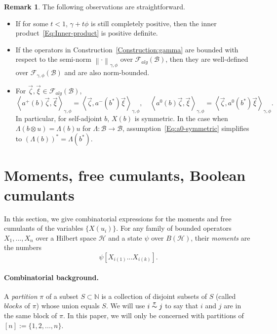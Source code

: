 \documentclass[12pt]{amsart}
\theoremstyle{definition}
\newtheorem{Remark}[Thm]{Remark}
\newcommand{\mc}[1]{\mathcal{#1}}
\newcommand{\ip}[2]{\left \langle{#1},{#2} \right \rangle}
\newcommand{\norm}[1]{\left \|{#1} \right \|}
\begin{document}
\begin{Remark}
The following observations are straightforward.
\begin{itemize}
\item
If for some $t < 1$, $\gamma + t \phi$ is still completely positive, then the inner product~\eqref{Eq:Inner-product} is positive definite.
\item
If the operators in Construction~\ref{Construction:gamma} are bounded with respect to the semi-norm $\norm{\cdot}_{\gamma, \phi}$ over $\mc{F}_{alg}(\mc{B})$, then they are well-defined over $\mc{F}_{\gamma, \phi}(\mc{B})$ and are also norm-bounded.
\item
For $\vec{\zeta}, \vec{\xi} \in \mc{F}_{alg}(\mc{B})$,
\[
\ip{a^+(b) \vec{\zeta}}{\vec{\xi}}_{\gamma, \phi} = \ip{\vec{\zeta}}{a^-(b^\ast) \vec{\xi}}_{\gamma, \phi}, \quad
\ip{a^0(b) \vec{\zeta}}{\vec{\xi}}_{\gamma, \phi} = \ip{\vec{\zeta}}{a^0(b^\ast) \vec{\xi}}_{\gamma, \phi}.
\]
In particular, for self-adjoint $b$, $X(b)$ is symmetric. In the case when $\Lambda(b \otimes u) = \Lambda(b) u$ for $\Lambda : \mc{B} \rightarrow \mc{B}$, assumption~\eqref{Eq:a0-symmetric} simplifies to $(\Lambda(b))^\ast = \Lambda(b^\ast)$.
\end{itemize}
\end{Remark}


\section{Moments, free cumulants, Boolean cumulants}
\label{Section:Cumulants}
In this section, we give combinatorial expressions for the moments and free cumulants of the variables $\{X(u_i)\}$. For any family of bounded operators $X_1, ..., X_n$ over a Hilbert space $\mc{H}$ and a state $\psi$ over $B(\mc{H})$, their \textit{moments} are the numbers
\begin{equation*}
\psi[X_{i(1)}...X_{i(k)}].
\end{equation*}


\paragraph{\textbf{Combinatorial background. }} A \textit{partition} $\pi$ of a subset $S\subset \mathbb{N}$ is a collection of disjoint subsets of $S$ (called $blocks$ of $\pi$) whose union equals $S$. We will use $i \overset{\pi}{\thicksim} j$ to say that $i$ and $j$ are in the same block of $\pi$. In this paper, we will only be concerned with partitions of $[n] :=\{1, 2, ..., n\}$.
\end{document}
